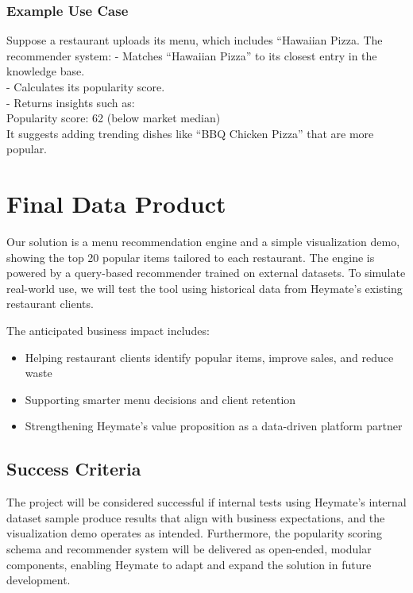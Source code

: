 \documentclass[
  11pt,
  a4paper,
  DIV=11,
  numbers=noendperiod]{scrartcl}
\providecommand{\tightlist}{%
  \setlength{\itemsep}{0pt}\setlength{\parskip}{0pt}}\usepackage{longtable,booktabs,array}
\begin{document}
\subsubsection{Example Use Case}\label{example-use-case}

Suppose a restaurant uploads its menu, which includes ``Hawaiian Pizza.
The recommender system: - Matches ``Hawaiian Pizza'' to its closest
entry in the knowledge base.\\
- Calculates its popularity score.\\
- Returns insights such as:\\
Popularity score: 62 (below market median)\\
It suggests adding trending dishes like ``BBQ Chicken Pizza'' that are
more popular.

\section{Final Data Product}\label{final-data-product}

Our solution is a menu recommendation engine and a simple visualization
demo, showing the top 20 popular items tailored to each restaurant. The
engine is powered by a query-based recommender trained on external
datasets. To simulate real-world use, we will test the tool using
historical data from Heymate's existing restaurant clients.

The anticipated business impact includes:

\begin{itemize}
\tightlist
\item
  Helping restaurant clients identify popular items, improve sales, and
  reduce waste\\
\item
  Supporting smarter menu decisions and client retention\\
\item
  Strengthening Heymate's value proposition as a data-driven platform
  partner
\end{itemize}

\subsection{Success Criteria}\label{success-criteria}

The project will be considered successful if internal tests using
Heymate's internal dataset sample produce results that align with
business expectations, and the visualization demo operates as intended.
Furthermore, the popularity scoring schema and recommender system will
be delivered as open-ended, modular components, enabling Heymate to
adapt and expand the solution in future development.
\end{document}

